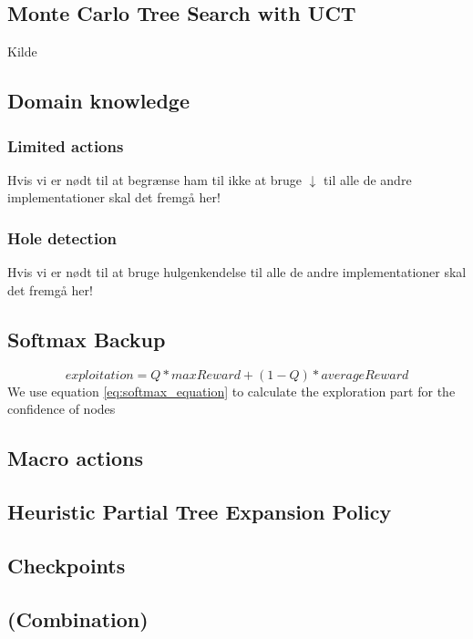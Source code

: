\documentclass[10pt,a4paper]{article}
\begin{document}
\subsection{Monte Carlo Tree Search with UCT}
Kilde \cite{mctssurvey}
\subsection{Domain knowledge}
\subsubsection{Limited actions}
Hvis vi er nødt til at begrænse ham til ikke at bruge $\downarrow$ til alle de andre implementationer skal det fremgå her!
\subsubsection{Hole detection}
Hvis vi er nødt til at bruge hulgenkendelse til alle de andre implementationer skal det fremgå her!
\subsection{Softmax Backup}
\begin{equation}\label{eq:softmax_equation}
exploitation = Q * maxReward + (1 - Q ) * averageReward
\end{equation}
We use equation \ref{eq:softmax_equation} to calculate the exploration part for the confidence of nodes
\subsection{Macro actions}
\cite{salesman}
\subsection{Heuristic Partial Tree Expansion Policy}
\subsection{Checkpoints}
\subsection{(Combination)}
\clearpage
\end{document}
